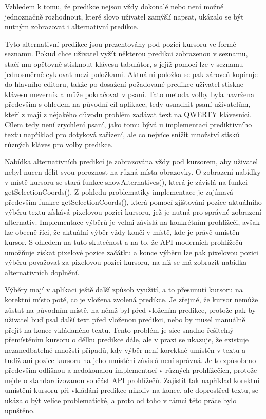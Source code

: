 \documentclass{article}
\begin{document}
Vzhledem k tomu, že predikce nejsou vždy dokonalé nebo není možné jednoznačně rozhodnout, které slovo uživatel zamýšlí napsat, ukázalo se být nutným zobrazovat i alternativní predikce. 

Tyto alternativní predikce jsou prezentovány pod pozicí kursoru ve formě seznamu. Pokud chce uživatel vyžít některou predikci zobrazenou v seznamu, stačí mu opětovně stisknout klávesu tabulátor, s jejíž pomocí lze v seznamu jednosměrně cyklovat mezi položkami. Aktuální položka se pak zároveň kopíruje do hlavního editoru, takže po dosažení požadované predikce uživatel stiskne klávesu mezerník a může pokračovat v psaní. Tato metoda volby byla navržena především s ohledem na původní cíl aplikace, tedy usnadnit psaní uživatelům, kteří z mají z nějakého důvodu problém zadávat text na QWERTY klávesnici. Cílem tedy není zrychlení psaní, jako tomu bývá u implementací prediktivního textu například pro dotyková zařízení, ale co nejvíce snížit množství stisků různých kláves pro volby predikce.

Nabídka alternativních predikcí je zobrazována vždy pod kursorem, aby uživatel nebyl nucen dělit svou poroznost na různá místa obrazovky. O zobrazení nabídky v místě kursoru se stará funkce showAlternatives(), která je závislá na funkci getSelectionCoords(). Z pohledu problematiky implementace je zajímavá především funkce getSelectionCoords(), která pomocí zjišťování pozice aktuálního výběru textu získává pixelovou pozici kursoru, jež je nutná pro správné zobrazení alternativ. Implementace výběrů je velmi závislá na konkrétním prohlížeči, avšak lze obecně říci, že aktuální výběr vždy končí v místě, kde je právě umístěn kursor. S ohledem na tuto skutečnost a na to, že API moderních prohlížečů umožňuje získat pixelové pozice začátku a konce výběru lze pak pixelovou pozici výběru považovat za pixelovou pozici kursoru, na níž se má zobrazit nabídka alternativních doplnění. 

Výběry mají v aplikaci ještě další způsob využití, a to přesunutí kursoru na korektní místo poté, co je vložena zvolená predikce. Je zřejmé, že kursor nemůže zůstat na původním místě, na němž byl před vložením predikce, protože pak by uživatel buď psal další text před vloženou predikci, nebo by musel manuálně přejít na konec vkládaného textu. Tento problém je sice snadno řešitelný přemístěním kursoru o délku predikce dále, ale v praxi se ukazuje, že existuje nezanedbatelné množstí případů, kdy výběr není korektně umístěn v textu a tudíž ani pozice kursoru na jeho umístění závislá není správná. Je to způsobeno především odlišnou a nedokonalou implementací v různých prohlížečích, protože nejde o standardizovanou součást API prohlížečů. Zajistit tak například korektní umístění kursoru při vkládání predikce nikoliv na konec, ale doprostřed textu, se ukázalo být velice problematické, a proto od toho v rámci této práce bylo upuštěno. 
\end{document}
